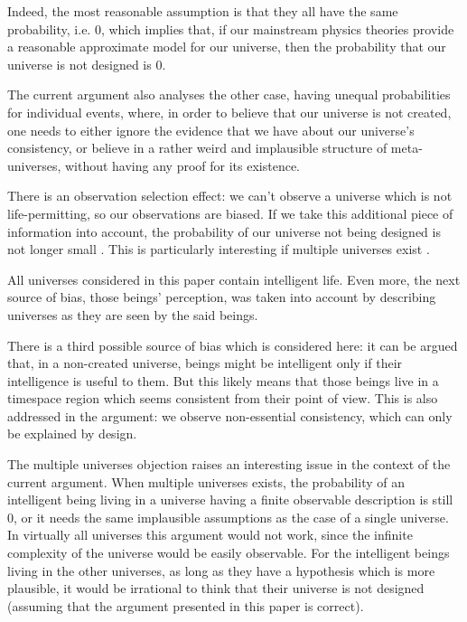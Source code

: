 \documentclass[a4paper
,draft
]{article}
\newcommand{\svn}[2][]{\todo[author=Virgil,color=red!25!white,#1]{#2}}
\newcommand{\paper}[1]{paper}
\newcommand{\ghilimele}[1]{``#1"}
\begin{document}
Indeed, the most reasonable assumption is that they all have the same
probability, i.e. $0$, which implies that, if our mainstream physics theories
provide a reasonable approximate model for our universe, then the probability
that our universe is not designed is $0$.

The current argument also analyses the other case, having unequal probabilities
for individual events, where, in order to believe that our universe is not
created, one needs to either ignore the evidence that we have about our
universe's consistency, or believe in a rather weird and implausible structure
of meta-universes, without having any proof for its existence.

There is an observation selection effect:
we can't observe a universe which is not life-permitting,
so our observations are biased.
If we take this additional piece of information into account,
the probability of our universe not being designed is not longer
small \parencite{Sober2009}.
This is particularly interesting if multiple universes
exist \parencite{Manson2009}.

All universes considered in this paper contain intelligent life. Even
more, the next source of bias, those beings' perception, was taken into account
by describing universes as they are seen by the said beings.

There is a third possible source of bias which is considered here: it can be
argued that, in a non-created universe, beings might be intelligent
only if their intelligence is useful to them. But this likely means that those
beings live in a timespace region which seems consistent from their point of
view. This is also addressed in the argument: we observe non-essential
consistency, which can only be explained by design.

The multiple universes objection raises an interesting issue in the context
of the current argument.
When multiple universes exists, the probability of an intelligent being
living in a universe having a finite observable description is still $0$, or
it needs the same implausible assumptions as the case of a single universe.
In virtually all universes this argument\svn{axiom ??? instead of
\ghilimele{this argument}} would not work, since the infinite complexity
of the universe would be easily observable.
For the intelligent beings living in the other universes, as long as they have
a hypothesis which is more plausible, it would be irrational to think that
their universe is not designed (assuming that the argument presented in
this \paper{} is correct).
\end{document}
